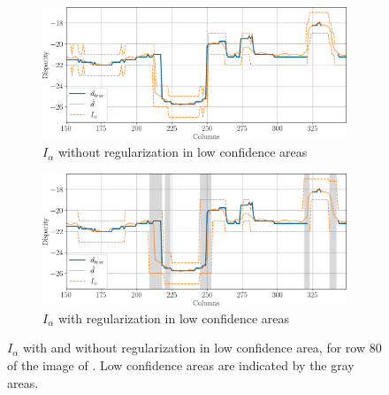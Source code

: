 \begin{figure}
    \centering
    \begin{subfigure}[t]{0.8\linewidth}
        \centering
        \includegraphics[width=\linewidth]{Images/Chap_5/intervals_ambiguous_area_row_80_1.png}
        \caption{$I_\alpha$ without regularization in low confidence areas}
        \label{fig:intervals_ambiguous_row_80_1}
    \end{subfigure}\hfill
    \begin{subfigure}[t]{0.8\linewidth}
        \centering
        \includegraphics[width=\linewidth]{Images/Chap_5/intervals_ambiguous_area_row_80_2.png}
        \caption{$I_\alpha$ with regularization in low confidence areas}
        \label{fig:intervals_ambiguous_row_80_2}
    \end{subfigure}
    \caption{$I_\alpha$ with and without regularization in low confidence area, for row $80$ of the image of . Low confidence areas are indicated by the gray areas.}
    \label{fig:intervals_ambiguous_row_80}
\end{figure}
